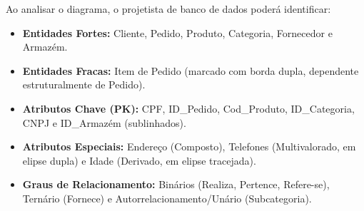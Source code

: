 Ao analisar o diagrama, o projetista de banco de dados poderá identificar:
\begin{itemize}
    \item \textbf{Entidades Fortes:} Cliente, Pedido, Produto, Categoria, Fornecedor e Armazém.
    \item \textbf{Entidades Fracas:} Item de Pedido (marcado com borda dupla, dependente estruturalmente de Pedido).
    \item \textbf{Atributos Chave (PK):} CPF, ID\_Pedido, Cod\_Produto, ID\_Categoria, CNPJ e ID\_Armazém (sublinhados).
    \item \textbf{Atributos Especiais:} Endereço (Composto), Telefones (Multivalorado, em elipse dupla) e Idade (Derivado, em elipse tracejada).
    \item \textbf{Graus de Relacionamento:} Binários (Realiza, Pertence, Refere-se), Ternário (Fornece) e Autorrelacionamento/Unário (Subcategoria).
\end{itemize}

